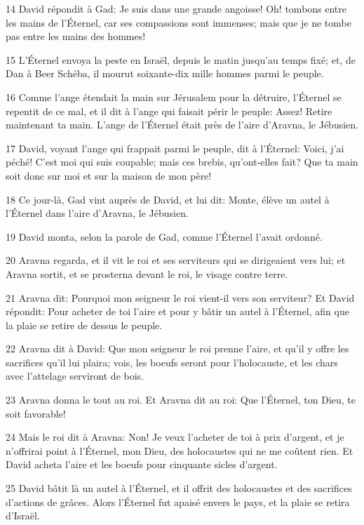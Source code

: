 \par 14 David répondit à Gad: Je suis dans une grande angoisse! Oh! tombons entre les mains de l'Éternel, car ses compassions sont immenses; mais que je ne tombe pas entre les mains des hommes!
\par 15 L'Éternel envoya la peste en Israël, depuis le matin jusqu'au temps fixé; et, de Dan à Beer Schéba, il mourut soixante-dix mille hommes parmi le peuple.
\par 16 Comme l'ange étendait la main sur Jérusalem pour la détruire, l'Éternel se repentit de ce mal, et il dit à l'ange qui faisait périr le peuple: Assez! Retire maintenant ta main. L'ange de l'Éternel était près de l'aire d'Aravna, le Jébusien.
\par 17 David, voyant l'ange qui frappait parmi le peuple, dit à l'Éternel: Voici, j'ai péché! C'est moi qui suis coupable; mais ces brebis, qu'ont-elles fait? Que ta main soit donc sur moi et sur la maison de mon père!
\par 18 Ce jour-là, Gad vint auprès de David, et lui dit: Monte, élève un autel à l'Éternel dans l'aire d'Aravna, le Jébusien.
\par 19 David monta, selon la parole de Gad, comme l'Éternel l'avait ordonné.
\par 20 Aravna regarda, et il vit le roi et ses serviteurs qui se dirigeaient vers lui; et Aravna sortit, et se prosterna devant le roi, le visage contre terre.
\par 21 Aravna dit: Pourquoi mon seigneur le roi vient-il vers son serviteur? Et David répondit: Pour acheter de toi l'aire et pour y bâtir un autel à l'Éternel, afin que la plaie se retire de dessus le peuple.
\par 22 Aravna dit à David: Que mon seigneur le roi prenne l'aire, et qu'il y offre les sacrifices qu'il lui plaira; vois, les boeufs seront pour l'holocauste, et les chars avec l'attelage serviront de bois.
\par 23 Aravna donna le tout au roi. Et Aravna dit au roi: Que l'Éternel, ton Dieu, te soit favorable!
\par 24 Mais le roi dit à Aravna: Non! Je veux l'acheter de toi à prix d'argent, et je n'offrirai point à l'Éternel, mon Dieu, des holocaustes qui ne me coûtent rien. Et David acheta l'aire et les boeufs pour cinquante sicles d'argent.
\par 25 David bâtit là un autel à l'Éternel, et il offrit des holocaustes et des sacrifices d'actions de grâces. Alors l'Éternel fut apaisé envers le pays, et la plaie se retira d'Israël.


